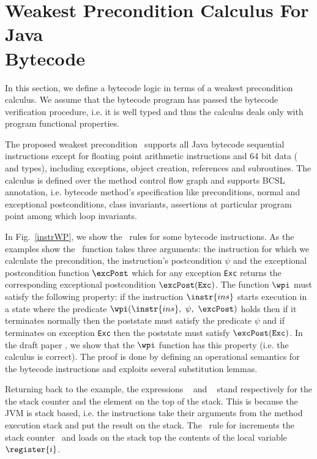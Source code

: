 
\section{Weakest Precondition Calculus For Java \\  Bytecode}\label{wpbc}
In this section, we define a bytecode logic in terms of a weakest precondition calculus.
We assume that the bytecode program has passed the bytecode verification procedure, i.e. it is well typed and
 thus the calculus deals only with program functional properties. 

The proposed weakest precondition \wpi \ supports all Java bytecode sequential instructions except for floating point
 arithmetic instructions and 64 bit data ( and  types), including exceptions, object creation,
 references and subroutines. The calculus is defined over the method control flow graph and supports BCSL annotation,
 i.e. bytecode method's specification like preconditions, normal and exceptional postconditions, class invariants,
 assertions at particular program point among which loop invariants.

 In Fig.~\ref{instrWP}, we show the \wpi \ rules for some bytecode instructions. 
As the examples show the \wpi \ function takes three arguments:
the instruction for which we calculate the precondition, 
the instruction's postcondition $\psi$ and the exceptional postcondition function $\excPost$ which for any exception \texttt{Exc} returns the
corresponding exceptional postcondition $\excPost(\texttt{Exc})$. 
The function $\wpi$ must satisfy the following property: if the instruction $\instr{ins}$ starts execution in a state where the predicate
$\wpi(\instr{ins}, \ \psi, \ \excPost)$ holds then if it terminates normally then the poststate must satisfy the predicate $\psi$  
and if terminates on exception \texttt{Exc} then  the poststate must satisfy $\excPost(\texttt{Exc})$.
 In the draft paper \cite{JBL05MP}, we show that the $\wpi$ function has this property (i.e. the calculus is correct). The proof is done by defining an operational semantics for the bytecode instructions and exploits several substitution lemmas.

Returning back to the example, the expressions \counter~ and  \stack{\counter}~ stand respectively for the the stack counter and the element on the top of the stack.
 This is because the JVM is stack based, i.e. the instructions take their arguments from the method execution stack and 
 put the result on the stack.
 The \wpi \ rule for   increments the stack counter \counter \ and loads on the stack top the contents
 of the local variable $\register{i}$. 

